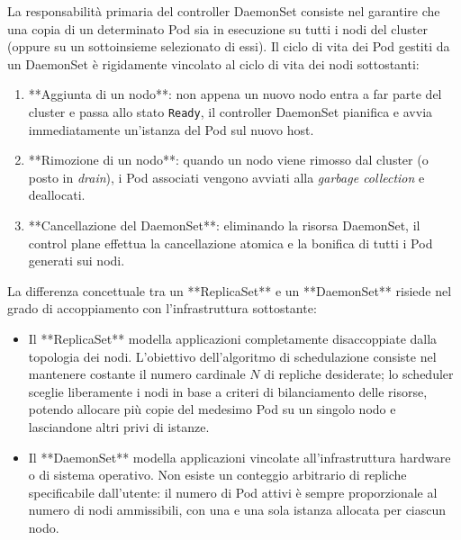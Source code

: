 \documentclass[11pt, a4paper]{article}
\begin{document}
La responsabilità primaria del controller DaemonSet consiste nel garantire che una copia di un determinato Pod sia in esecuzione su tutti i nodi del cluster (oppure su un sottoinsieme selezionato di essi). Il ciclo di vita dei Pod gestiti da un DaemonSet è rigidamente vincolato al ciclo di vita dei nodi sottostanti:
\begin{enumerate}[noitemsep]
    \item **Aggiunta di un nodo**: non appena un nuovo nodo entra a far parte del cluster e passa allo stato \texttt{Ready}, il controller DaemonSet pianifica e avvia immediatamente un'istanza del Pod sul nuovo host.
    \item **Rimozione di un nodo**: quando un nodo viene rimosso dal cluster (o posto in \emph{drain}), i Pod associati vengono avviati alla \emph{garbage collection} e deallocati.
    \item **Cancellazione del DaemonSet**: eliminando la risorsa DaemonSet, il control plane effettua la cancellazione atomica e la bonifica di tutti i Pod generati sui nodi.
\end{enumerate}

La differenza concettuale tra un **ReplicaSet** e un **DaemonSet** risiede nel grado di accoppiamento con l'infrastruttura sottostante:
\begin{itemize}[noitemsep]
    \item Il **ReplicaSet** modella applicazioni completamente disaccoppiate dalla topologia dei nodi. L'obiettivo dell'algoritmo di schedulazione consiste nel mantenere costante il numero cardinale $N$ di repliche desiderate; lo scheduler sceglie liberamente i nodi in base a criteri di bilanciamento delle risorse, potendo allocare più copie del medesimo Pod su un singolo nodo e lasciandone altri privi di istanze.
    \item Il **DaemonSet** modella applicazioni vincolate all'infrastruttura hardware o di sistema operativo. Non esiste un conteggio arbitrario di repliche specificabile dall'utente: il numero di Pod attivi è sempre proporzionale al numero di nodi ammissibili, con una e una sola istanza allocata per ciascun nodo.
\end{itemize}

\end{document}
